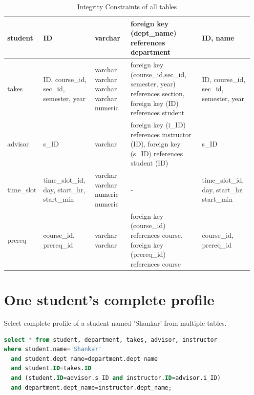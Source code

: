 \documentclass{article}
\begin{document}
\clearpage

    \begin{table}[ht]
\begin{tabular}{||p{2cm}||p{2cm}||p{2cm}||p{3cm}||p{2cm}||}
\hline \hline
 
student & ID & varchar & foreign key (dept\_name) references department & ID, name \\ \hline \hline

takes & ID, course\_id, sec\_id, semester, year & varchar \newline varchar \newline varchar \newline varchar \newline numeric & foreign key (course\_id,sec\_id, semester, year) references section,
	 foreign key (ID) references student & ID, course\_id, sec\_id, semester, year \\ \hline \hline

advisor & s\_ID  & varchar & foreign key (i\_ID) references instructor (ID), foreign key (s\_ID) references student (ID) & s\_ID \\ \hline \hline

time\_slot & time\_slot\_id, day, start\_hr, start\_min & varchar \newline varchar \newline numeric \newline numeric & - & time\_slot\_id, day, start\_hr, start\_min \\ \hline \hline
	 
prereq & course\_id, prereq\_id & varchar \newline varchar & foreign key (course\_id) references course,
	 foreign key (prereq\_id) references course & course\_id, prereq\_id\\ \hline \hline
	 

\end{tabular}
\caption{Integrity Constraints of all tables}
\end{table}

\newpage
\section{One student's complete profile}
Select complete profile of a student named 'Shankar' from multiple tables.
\begin{lstlisting}[language=sql]
select * from student, department, takes, advisor, instructor
where student.name='Shankar' 
  and student.dept_name=department.dept_name 
  and student.ID=takes.ID 
  and (student.ID=advisor.s_ID and instructor.ID=advisor.i_ID) 
  and department.dept_name=instructor.dept_name;
\end{lstlisting}
\end{document}
